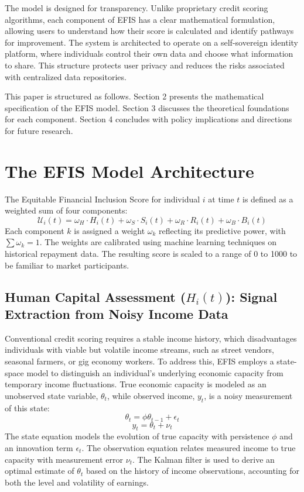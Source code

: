 \documentclass{article}
\begin{document}
The model is designed for transparency. Unlike proprietary credit scoring algorithms, each component of EFIS has a clear mathematical formulation, allowing users to understand how their score is calculated and identify pathways for improvement. The system is architected to operate on a self-sovereign identity platform, where individuals control their own data and choose what information to share. This structure protects user privacy and reduces the risks associated with centralized data repositories.

This paper is structured as follows. Section 2 presents the mathematical specification of the EFIS model. Section 3 discusses the theoretical foundations for each component. Section 4 concludes with policy implications and directions for future research.

\section{The EFIS Model Architecture}

The Equitable Financial Inclusion Score for individual $i$ at time $t$ is defined as a weighted sum of four components:
$$
\mathcal{U}_i(t) = \omega_H \cdot H_i(t) + \omega_S \cdot S_i(t) + \omega_R \cdot R_i(t) + \omega_B \cdot B_i(t)
$$
Each component $k$ is assigned a weight $\omega_k$ reflecting its predictive power, with $\sum \omega_k = 1$. The weights are calibrated using machine learning techniques on historical repayment data. The resulting score is scaled to a range of 0 to 1000 to be familiar to market participants.

\subsection{Human Capital Assessment ($H_i(t)$): Signal Extraction from Noisy Income Data}

Conventional credit scoring requires a stable income history, which disadvantages individuals with viable but volatile income streams, such as street vendors, seasonal farmers, or gig economy workers. To address this, EFIS employs a state-space model to distinguish an individual's underlying economic capacity from temporary income fluctuations. True economic capacity is modeled as an unobserved state variable, $\theta_t$, while observed income, $y_t$, is a noisy measurement of this state:
$$
\theta_t = \phi \theta_{t-1} + \epsilon_t
$$
$$
y_t = \theta_t + \nu_t
$$
The state equation models the evolution of true capacity with persistence $\phi$ and an innovation term $\epsilon_t$. The observation equation relates measured income to true capacity with measurement error $\nu_t$. The Kalman filter is used to derive an optimal estimate of $\theta_t$ based on the history of income observations, accounting for both the level and volatility of earnings.
\end{document}
